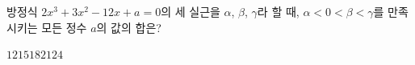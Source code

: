 방정식 $2x^3+3x^2-12x+a=0$의 세 실근을 $\alpha$, $\beta$, $\gamma$라 할 때, $\alpha<0<\beta<\gamma$를 만족시키는 모든 정수 $a$의 값의 합은?
\begin{choices32}{$12$}{$15$}{$18$}{$21$}{$24$}\end{choices32}
